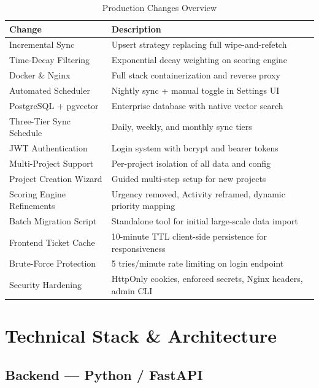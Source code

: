 \documentclass[12pt, a4paper]{article}
\begin{document}
\begin{table}[H]
\centering
\caption{Production Changes Overview}
\begin{tabularx}{\textwidth}{|X|X|}
\hline
\textbf{Change} & \textbf{Description} \\
\hline
Incremental Sync         & Upsert strategy replacing full wipe-and-refetch \\
Time-Decay Filtering     & Exponential decay weighting on scoring engine \\
Docker \& Nginx          & Full stack containerization and reverse proxy \\
Automated Scheduler      & Nightly sync + manual toggle in Settings UI \\
PostgreSQL + pgvector    & Enterprise database with native vector search \\
Three-Tier Sync Schedule & Daily, weekly, and monthly sync tiers \\
JWT Authentication       & Login system with bcrypt and bearer tokens \\
Multi-Project Support    & Per-project isolation of all data and config \\
Project Creation Wizard  & Guided multi-step setup for new projects \\
Scoring Engine Refinements & Urgency removed, Activity reframed, dynamic priority mapping \\
Batch Migration Script   & Standalone tool for initial large-scale data import \\
Frontend Ticket Cache    & 10-minute TTL client-side persistence for responsiveness \\
Brute-Force Protection   & 5 tries/minute rate limiting on login endpoint \\
Security Hardening       & HttpOnly cookies, enforced secrets, Nginx headers, admin CLI \\
\hline
\end{tabularx}
\end{table}


\section{Technical Stack \& Architecture}

\subsection{Backend — Python / FastAPI}
\end{document}
